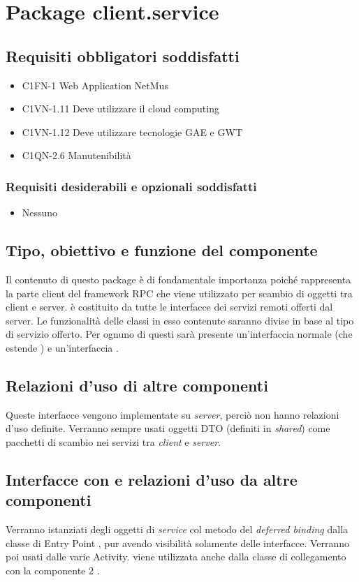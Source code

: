 \newpage
\section{Package client.service} %
\subsection*{Requisiti obbligatori soddisfatti}
\begin{itemize}
    \item C1FN-1 Web Application NetMus
    \item C1VN-1.11 Deve utilizzare il cloud computing
    \item C1VN-1.12 Deve utilizzare tecnologie GAE e GWT
    \item C1QN-2.6 Manutenibilit\`a
\end{itemize}
\subsubsection*{Requisiti desiderabili e opzionali soddisfatti}
\begin{itemize}
    \item Nessuno
\end{itemize}
\subsection*{Tipo, obiettivo e funzione del componente}
Il contenuto di questo package \`e di fondamentale importanza poich\'e
rappresenta la parte client del framework RPC che viene utilizzato per scambio
di oggetti tra client e server.  \`e costituito da tutte
le interfacce dei servizi remoti offerti dal server. Le funzionalit\`a delle
classi in esso contenute saranno divise in base al tipo di servizio offerto. Per
ognuno di questi sar\`a presente un'interfaccia normale (che estende
) e un'interfaccia .
\subsection*{Relazioni d'uso
di altre componenti} Queste interfacce vengono implementate su \emph{server}, perci\`o non
hanno relazioni d'uso definite. Verranno sempre usati oggetti DTO (definiti in
\emph{shared}) come pacchetti di scambio nei servizi tra \emph{client} e
\emph{server}.
\subsection*{Interfacce con e relazioni d'uso da altre componenti}
Verranno istanziati degli oggetti di \emph{service} col metodo del
\emph{deferred binding} dalla classe di Entry Point , pur avendo
visibilit\`a solamente delle interfacce. Verranno poi usati dalle varie Activity.
 viene utilizzata anche dalla classe di collegamento con la
componente 2 . 
